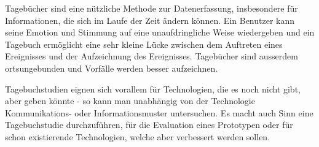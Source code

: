 Tagebücher sind eine nützliche Methode zur Datenerfassung, 
insbesondere für Informationen, die sich im Laufe der Zeit ändern können.
Ein Benutzer kann seine Emotion und Stimmung auf eine unaufdringliche Weise wiedergeben
und ein Tagebuch ermöglicht eine sehr kleine Lücke zwischen dem Auftreten eines Ereignisses und der
Aufzeichnung des Ereignisses. Tagebücher sind ausserdem ortsungebunden und Vorfälle werden
besser aufzeichnen. 

Tagebuchstudien eignen sich vorallem für Technologien, die es noch nicht gibt, aber geben könnte -
so kann man unabhängig von der Technologie Kommunikations- oder
Informationsmuster untersuchen. Es macht auch Sinn eine Tagebuchstudie durchzuführen, für die Evaluation eines
Prototypen oder für schon existierende Technologien, welche aber verbessert werden sollen.